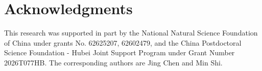 \section*{Acknowledgments}
This research was supported in part by the National Natural Science Foundation of China under grants  No. 62625207, 62602479, 
and the China Postdoctoral Science Foundation - Hubei Joint Support Program under Grant Number 2026T077HB. 
The  corresponding  authors  are  Jing Chen and Min Shi.
